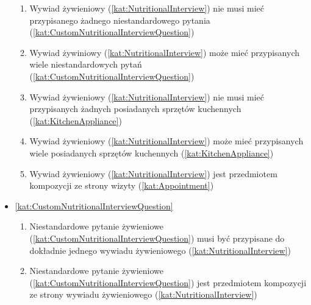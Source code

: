 \begin{itemize}[label={\textbf{Reguły dla}}, wide, labelwidth=!, labelindent=0pt]
\begin{enumerate}[label={\textbf{REG/\protect\threedigits{\arabic{enumi}}}}, wide, labelwidth=!, align=left, leftmargin=3cm, resume]
        \item Wywiad żywieniowy (\ref{kat:NutritionalInterview}) nie musi mieć przypisanego żadnego niestandardowego pytania (\ref{kat:CustomNutritionalInterviewQuestion})
        \item Wywiad żywiniowy (\ref{kat:NutritionalInterview}) może mieć przypisanych wiele niestandardowych pytań (\ref{kat:CustomNutritionalInterviewQuestion})
        \item Wywiad żywieniowy (\ref{kat:NutritionalInterview}) nie musi mieć przypisanych żadnych posiadanych sprzętów kuchennych (\ref{kat:KitchenAppliance})
        \item Wywiad żywieniowy (\ref{kat:NutritionalInterview}) może mieć przypisanych wiele posiadanych sprzętów kuchennych (\ref{kat:KitchenAppliance})
        \item Wywiad żywieniowy (\ref{kat:NutritionalInterview}) jest przedmiotem kompozycji ze strony wizyty (\ref{kat:Appointment})
    \end{enumerate}
    \item\ref{kat:CustomNutritionalInterviewQuestion}
    \begin{enumerate}[label={\textbf{REG/\protect\threedigits{\arabic{enumi}}}}, wide, labelwidth=!, align=left, leftmargin=3cm, resume]
        \item Niestandardowe pytanie żywieniowe (\ref{kat:CustomNutritionalInterviewQuestion}) musi być przypisane do dokładnie jednego wywiadu żywieniowego (\ref{kat:NutritionalInterview})
        \item  Niestandardowe pytanie żywieniowe (\ref{kat:CustomNutritionalInterviewQuestion}) jest przedmiotem kompozycji ze strony wywiadu żywieniowego (\ref{kat:NutritionalInterview})
    \end{enumerate}

\end{itemize}
